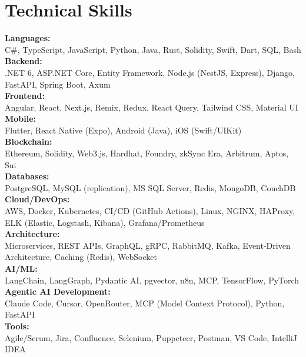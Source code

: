\section{Technical Skills}
 \begin{itemize}[leftmargin=0.15in, label={}]
    \small{\item{
     \textbf{Languages:} \\
     \quad \textbullet{} C\#, TypeScript, JavaScript, Python, Java, Rust, Solidity, Swift, Dart, SQL, Bash \\ \vspace{2pt}
     \textbf{Backend:} \\
     \quad \textbullet{} .NET 6, ASP.NET Core, Entity Framework, Node.js (NestJS, Express), Django, FastAPI, Spring Boot, Axum \\ \vspace{2pt}
     \textbf{Frontend:} \\
     \quad \textbullet{} Angular, React, Next.js, Remix, Redux, React Query, Tailwind CSS, Material UI \\ \vspace{2pt}
     \textbf{Mobile:} \\
     \quad \textbullet{} Flutter, React Native (Expo), Android (Java), iOS (Swift/UIKit) \\ \vspace{2pt}
     \textbf{Blockchain:} \\
     \quad \textbullet{} Ethereum, Solidity, Web3.js, Hardhat, Foundry, zkSync Era, Arbitrum, Aptos, Sui \\ \vspace{2pt}
     \textbf{Databases:} \\
     \quad \textbullet{} PostgreSQL, MySQL (replication), MS SQL Server, Redis, MongoDB, CouchDB \\ \vspace{2pt}
     \textbf{Cloud/DevOps:} \\
     \quad \textbullet{} AWS, Docker, Kubernetes, CI/CD (GitHub Actions), Linux, NGINX, HAProxy, ELK (Elastic, Logstash, Kibana), Grafana/Prometheus \\ \vspace{2pt}
     \textbf{Architecture:} \\
     \quad \textbullet{} Microservices, REST APIs, GraphQL, gRPC, RabbitMQ, Kafka, Event-Driven Architecture, Caching (Redis), WebSocket \\ \vspace{2pt}
     \textbf{AI/ML:} \\
     \quad \textbullet{} LangChain, LangGraph, Pydantic AI, pgvector, n8n, MCP, TensorFlow, PyTorch \\ \vspace{2pt}
     \textbf{Agentic AI Development:} \\
     \quad \textbullet{} Claude Code, Cursor, OpenRouter, MCP (Model Context Protocol), Python, FastAPI \\ \vspace{2pt}
     \textbf{Tools:} \\
     \quad \textbullet{} Agile/Scrum, Jira, Confluence, Selenium, Puppeteer, Postman, VS Code, IntelliJ IDEA
    }}
 \end{itemize}